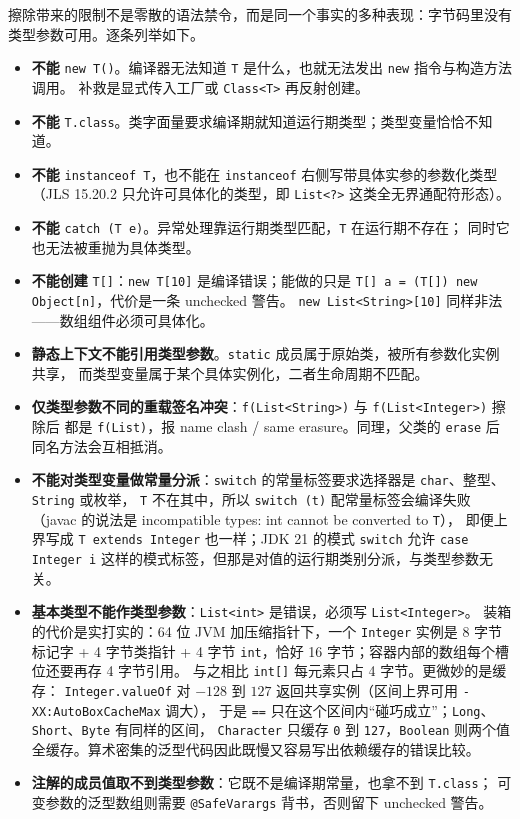 \documentclass[12pt,a4paper,fontset=fandol]{ctexbook}
\newcommand{\kw}[1]{\texttt{#1}}
\begin{document}
擦除带来的限制不是零散的语法禁令，而是同一个事实的多种表现：字节码里没有类型参数可用。逐条列举如下。

\begin{itemize}
  \item \textbf{不能} \kw{new T()}。编译器无法知道 \kw{T} 是什么，也就无法发出 \kw{new} 指令与构造方法调用。
        补救是显式传入工厂或 \kw{Class<T>} 再反射创建。
  \item \textbf{不能} \kw{T.class}。类字面量要求编译期就知道运行期类型；类型变量恰恰不知道。
  \item \textbf{不能} \kw{instanceof T}，也不能在 \kw{instanceof} 右侧写带具体实参的参数化类型
        （JLS 15.20.2 只允许可具体化的类型，即 \kw{List<?>} 这类全无界通配符形态）。
  \item \textbf{不能} \kw{catch (T e)}。异常处理靠运行期类型匹配，\kw{T} 在运行期不存在；
        同时它也无法被重抛为具体类型。
  \item \textbf{不能创建} \kw{T[]}：\kw{new T[10]} 是编译错误；能做的只是
        \kw{T[] a = (T[]) new Object[n]}，代价是一条 unchecked 警告。
        \kw{new List<String>[10]} 同样非法——数组组件必须可具体化。
  \item \textbf{静态上下文不能引用类型参数}。\kw{static} 成员属于原始类，被所有参数化实例共享，
        而类型变量属于某个具体实例化，二者生命周期不匹配。
  \item \textbf{仅类型参数不同的重载签名冲突}：\kw{f(List<String>)} 与 \kw{f(List<Integer>)} 擦除后
        都是 \kw{f(List)}，报 name clash / same erasure。同理，父类的 \kw{erase} 后同名方法会互相抵消。
  \item \textbf{不能对类型变量做常量分派}：\kw{switch} 的常量标签要求选择器是 \kw{char}、整型、\kw{String} 或枚举，
        \kw{T} 不在其中，所以 \kw{switch (t)} 配常量标签会编译失败
        （javac 的说法是 incompatible types: int cannot be converted to \kw{T}），
        即便上界写成 \kw{T extends Integer} 也一样；JDK 21 的模式 \kw{switch} 允许
        \kw{case Integer i} 这样的模式标签，但那是对值的运行期类别分派，与类型参数无关。
  \item \textbf{基本类型不能作类型参数}：\kw{List<int>} 是错误，必须写 \kw{List<Integer>}。
        装箱的代价是实打实的：64 位 JVM 加压缩指针下，一个 \kw{Integer} 实例是
        8 字节标记字 + 4 字节类指针 + 4 字节 \kw{int}，恰好 16 字节；容器内部的数组每个槽位还要再存 4 字节引用。
        与之相比 \kw{int[]} 每元素只占 4 字节。更微妙的是缓存：
        \kw{Integer.valueOf} 对 $-128$ 到 $127$ 返回共享实例（区间上界可用 \kw{-XX:AutoBoxCacheMax} 调大），
        于是 \kw{==} 只在这个区间内“碰巧成立”；\kw{Long}、\kw{Short}、\kw{Byte} 有同样的区间，
        \kw{Character} 只缓存 \kw{0} 到 \kw{127}，\kw{Boolean} 则两个值全缓存。算术密集的泛型代码因此既慢又容易写出依赖缓存的错误比较。
  \item \textbf{注解的成员值取不到类型参数}：它既不是编译期常量，也拿不到 \kw{T.class}；
        可变参数的泛型数组则需要 \kw{@SafeVarargs} 背书，否则留下 unchecked 警告。
\end{itemize}
\end{document}
